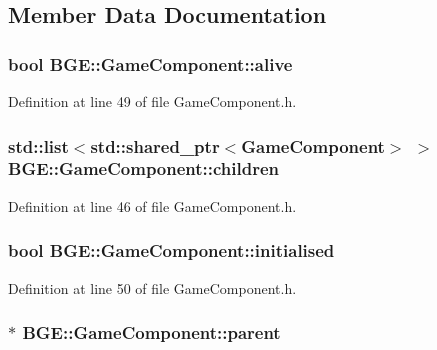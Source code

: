 \subsection{Member Data Documentation}
\hypertarget{class_b_g_e_1_1_game_component_a4970da7fc085e98e6eb30d311798a107}{
\subsubsection[{alive}]{\setlength{\rightskip}{0pt plus 5cm}bool B\-G\-E\-::\-Game\-Component\-::alive}}\label{class_b_g_e_1_1_game_component_a4970da7fc085e98e6eb30d311798a107}


Definition at line 49 of file Game\-Component.\-h.

\hypertarget{class_b_g_e_1_1_game_component_a58420cfb1df531c60191cce09f0e6b4c}{
\subsubsection[{children}]{\setlength{\rightskip}{0pt plus 5cm}std\-::list$<$std\-::shared\-\_\-ptr$<${\bf Game\-Component}$>$ $>$ B\-G\-E\-::\-Game\-Component\-::children}}\label{class_b_g_e_1_1_game_component_a58420cfb1df531c60191cce09f0e6b4c}


Definition at line 46 of file Game\-Component.\-h.

\hypertarget{class_b_g_e_1_1_game_component_aeccb76e843b38bee0a6faa6e40eda1ff}{
\subsubsection[{initialised}]{\setlength{\rightskip}{0pt plus 5cm}bool B\-G\-E\-::\-Game\-Component\-::initialised}}\label{class_b_g_e_1_1_game_component_aeccb76e843b38bee0a6faa6e40eda1ff}


Definition at line 50 of file Game\-Component.\-h.

\hypertarget{class_b_g_e_1_1_game_component_acdf201a241a0bc654b1306a627964903}{
\subsubsection[{parent}]{$\ast$ B\-G\-E\-::\-Game\-Component\-::parent}}\label{class_b_g_e_1_1_game_component_acdf201a241a0bc654b1306a627964903}


